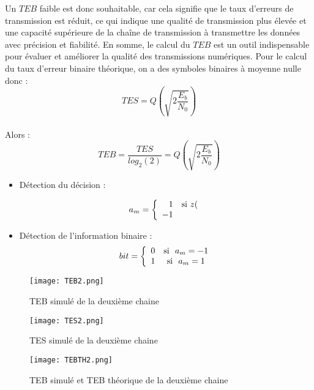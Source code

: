 \documentclass[11pt]{article}
\begin{document}
Un $TEB$ faible est donc souhaitable, car cela signifie que le taux d'erreurs de transmission est réduit, ce qui indique une qualité de transmission plus élevée et une capacité supérieure de la chaîne de transmission à transmettre les données avec précision et fiabilité. En somme, le calcul du $TEB$ est un outil indispensable pour évaluer et améliorer la qualité des transmissions numériques.
Pour le calcul du taux d'erreur binaire théorique, on a des symboles binaires à moyenne nulle donc : 
$$ TES = Q( \sqrt{ 2 \frac{E_{b}}{N_{0}}}) $$ 
\\Alors :
  \ $$TEB = \frac{TES}{log_{2}(2)} = Q( \sqrt{ 2 \frac{E_{b}}{N_{0}}})$$

\begin{itemize}
    \item Détection du décision :  \par
    
    \[
a_{m} = 
\left \{
   \begin{array}{r c l}
      1 & \text{si} \ z( \\
      -1
   \end{array}
\right .
\]

    \item Détection de l'information binaire : 
    \[
bit =  
\left \{
   \begin{array}{r c l}
      0 & \text{si } \ a_{m} =  -1\\
      1 & \text{si } \ a_{m} = 1 \\
     
   \end{array}
\right .
\]

    
\end{itemize}

\clearpage
\begin{figure}[h]
  \centering
  \texttt{[image: TEB2.png]}
  \caption{TEB simulé de la deuxième chaine}
  \label{fig:nom_de_la_figure}
  \vspace{0.2cm}
\end{figure}

\begin{figure}[h]
  \centering
  \texttt{[image: TES2.png]}
  \caption{TES simulé de la deuxième chaine}
  \label{fig:nom_de_la_figure}
  \vspace{0.2cm}
\end{figure}

\begin{figure}[h]
  \centering
  \texttt{[image: TEBTH2.png]}
  \caption{TEB simulé et TEB théorique de la deuxième chaine}
  \label{fig:nom_de_la_figure}
  \vspace{0.2cm}
\end{figure}
\end{document}
